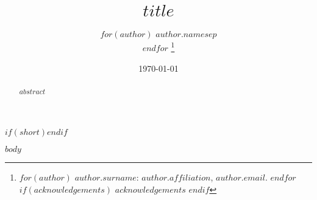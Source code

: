 \documentclass[$journal$]{AEA}
\begin{document}
\title{$title$}
$if(short)$$endif$


\author{
$for(author)$
  $author.name$$sep$\\
$endfor$
\thanks{
$for(author)$
  $author.surname$: $author.affiliation$, \href{mailto:$author.email$}{$author.email$}.
$endfor$
$if(acknowledgements)$
  $acknowledgements$
$endif$
}
}

\date{\today}

\begin{abstract}
$abstract$
\end{abstract}


\maketitle

$body$
\end{document}
